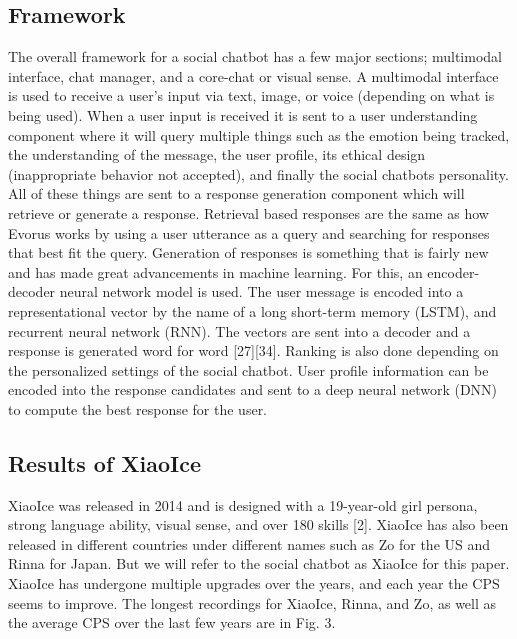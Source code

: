 \documentclass[letterpaper, 10 pt, conference]{IEEEtran}
\begin{document}
\subsection{Framework}
The overall framework for a social chatbot has a few major sections; multimodal interface, chat manager, and a core-chat or visual sense. A multimodal interface is used to receive a user's input via text, image, or voice (depending on what is being used). When a user input is received it is sent to a user understanding component where it will query multiple things such as the emotion being tracked, the understanding of the message, the user profile, its ethical design (inappropriate behavior not accepted), and finally the social chatbots personality. All of these things are sent to a response generation component which will retrieve or generate a response. Retrieval based responses are the same as how Evorus works by using a user utterance as a query and searching for responses that best fit the query. Generation of responses is something that is fairly new and has made great advancements in machine learning. For this, an encoder-decoder neural network model is used. The user message is encoded into a representational vector by the name of a long short-term memory (LSTM), and recurrent neural network (RNN). The vectors are sent into a decoder and a response is generated word for word [27][34]. Ranking is also done depending on the personalized settings of the social chatbot. User profile information can be encoded into the response candidates and sent to a deep neural network (DNN) to compute the best response for the user.

\subsection{Results of XiaoIce} 
XiaoIce was released in 2014 and is designed with a 19-year-old girl persona, strong language ability, visual sense, and over 180 skills [2]. XiaoIce has also been released in different countries under different names such as Zo for the US and Rinna for Japan. But we will refer to the social chatbot as XiaoIce for this paper. XiaoIce has undergone multiple upgrades over the years, and each year the CPS seems to improve. The longest recordings for XiaoIce, Rinna, and Zo, as well as the average CPS over the last few years are in Fig. 3. 
\end{document}
